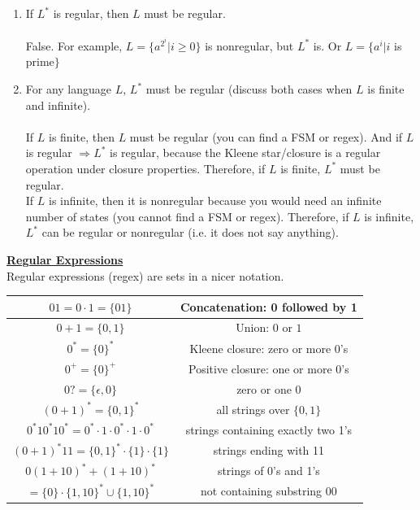 \documentclass[8pt,letterpaper,twocolumn]{article}
\begin{document}
  \begin{enumerate}
  \item If $L^*$ is regular, then $L$ must be regular.\\
  \\
  False. For example, $L = \{a^{2^i} | i \geq 0\}$ is nonregular, but $L^*$ is.
  Or $L = \{a^i | i$ is prime$\}$
  
  \item For any language $L$, $L^*$ must be regular
  (discuss both cases when $L$ is finite and infinite).\\
  \\
  If $L$ is finite, then $L$ must be regular (you can find a FSM or regex).
  And if $L$ is regular $\Rightarrow L^*$ is regular, because
  the Kleene star/closure is a regular operation under closure properties.
  Therefore, if $L$ is finite, $L^*$ must be regular.\\
  If $L$ is infinite, then it is nonregular because you would need an
  infinite number of states (you cannot find a FSM or regex).
  Therefore, if $L$ is infinite, $L^*$ can be regular or nonregular (i.e. it does not say anything).
  \end{enumerate}
\underline{\textbf{Regular Expressions}}\\
Regular expressions (regex) are sets in a nicer notation.
\begin{tabular}{|c|c|}
\hline
$01 = 0 \cdot 1 = \{01\}$ & Concatenation: 0 followed by 1\\
\hline 
$0+1 = \{0,1\}$ & Union: $0$ or $1$\\ 
\hline 
$0^* = \{0\}^*$ & Kleene closure: zero or more 0's\\ 
\hline
$0^+ = \{0\}^+$ & Positive closure: one or more 0's\\
\hline
$0? = \{\epsilon, 0\}$ & zero or one 0\\
\hline
$(0+1)^* = \{0,1\}^*$ &  all strings over $\{0,1\}$\\
\hline
$0^*10^*10^* = 0^* \cdot 1 \cdot 0^* \cdot 1 \cdot 0^*$ & strings containing exactly two 1's\\
\hline
$(0+1)^*11 = \{0,1\}^*\cdot \{1\} \cdot \{1\}$ & strings ending with 11\\
\hline
$0(1+10)^*+(1+10)^* $ & strings of 0's and 1's \\
$= \{0\} \cdot \{1,10\}^* \cup \{1,10\}^*$ & not containing substring 00\\
\hline
\end{tabular} 
\end{document}
